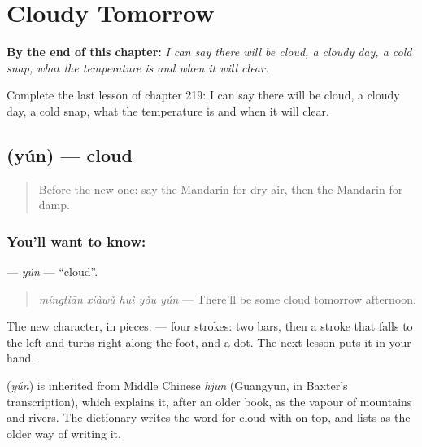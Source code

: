 
\chapter{Cloudy Tomorrow}
\label{ch:zh-cloudy-tomorrow}

\begin{chapteropening}
\textbf{By the end of this chapter:} \emph{I can say there will be cloud, a cloudy day, a cold snap, what the temperature is and when it will clear.}

Complete the last lesson of chapter 219: I can say there will be cloud, a cloudy day, a cold snap, what the temperature is and when it will clear.
\end{chapteropening}

\section[\texorpdfstring{\zh{云} (yún)}{云 (yún)}]{ (yún) — cloud}

\label{lesson:ZH-C219-yun}



\begin{quote}
Before the new one: say the Mandarin for dry air, then the Mandarin for damp.
\end{quote}

\subsection*{You'll want to know: }
\textbf{} — \emph{yún} — \textquotedblleft{}cloud\textquotedblright{}.

\begin{quote}
\textbf{} \emph{míngtiān xiàwǔ huì yǒu yún} — There'll be some cloud tomorrow afternoon.
\end{quote}

The new character, in pieces:  — four strokes: two bars, then a stroke that falls to the left and turns right along the foot, and a dot. The next lesson puts it in your hand.

\begin{cousinweb}
\textbf{} (\emph{yún}) is inherited from Middle Chinese \emph{hjun} (Guangyun, in Baxter's transcription), which explains it, after an older book, as the vapour of mountains and rivers. The dictionary writes the word for cloud with  on top, and lists  as the older way of writing it.
\end{cousinweb}

